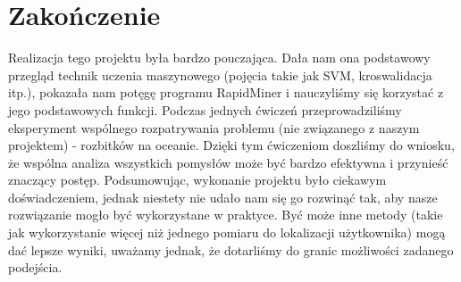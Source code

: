 \documentclass{article}
\begin{document}
\section{Zakończenie}
Realizacja tego projektu była bardzo pouczająca. Dała nam ona podstawowy przegląd technik uczenia maszynowego (pojęcia takie jak SVM, kroswalidacja itp.), pokazała nam potęgę programu RapidMiner i nauczyliśmy się korzystać z jego podstawowych funkcji. Podczas jednych ćwiczeń przeprowadziliśmy eksperyment wspólnego rozpatrywania problemu (nie związanego z naszym projektem) - rozbitków na oceanie. Dzięki tym ćwiczeniom doszliśmy do wniosku, że wspólna analiza wszystkich pomysłów może być bardzo efektywna i przynieść znaczący postęp. Podsumowując, wykonanie projektu było ciekawym doświadczeniem, jednak niestety nie udało nam się go rozwinąć tak, aby nasze rozwiązanie mogło być wykorzystane w praktyce. Być może inne metody (takie jak wykorzystanie więcej niż jednego pomiaru do lokalizacji użytkownika) mogą dać lepsze wyniki, uważamy jednak, że dotarliśmy do granic możliwości zadanego podejścia. 
\end{document}
